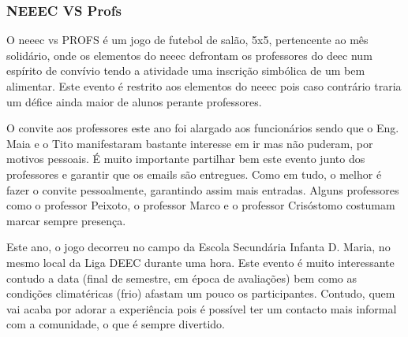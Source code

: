 
\subsubsection{NEEEC VS Profs}

O \acrshort{neeec} vs PROFS é um jogo de futebol de salão, 5x5, pertencente ao mês solidário, onde os elementos do \acrshort{neeec} defrontam os professores do \acrshort{deec} num espírito de convívio tendo a atividade uma inscrição simbólica de um bem alimentar. Este evento é restrito aos elementos do \acrshort{neeec} pois caso contrário traria um défice ainda maior de alunos perante professores.

O convite aos professores este ano foi alargado aos funcionários sendo que o Eng. Maia e o Tito manifestaram bastante interesse em ir mas não puderam, por motivos pessoais. É muito importante partilhar bem este evento junto dos professores e garantir que os emails são entregues. Como em tudo, o melhor é fazer o convite pessoalmente, garantindo assim mais entradas. Alguns professores como o professor Peixoto, o professor Marco e o professor Crisóstomo costumam marcar sempre presença.

Este ano, o jogo decorreu no campo da Escola Secundária Infanta D. Maria, no mesmo local da Liga DEEC durante uma hora. Este evento é muito interessante contudo a data (final de semestre, em época de avaliações) bem como as condições climatéricas (frio) afastam um pouco os participantes. Contudo, quem vai acaba por adorar a experiência pois é possível ter um contacto mais informal com a comunidade, o que é sempre divertido.